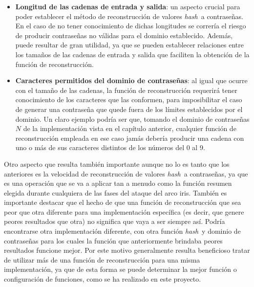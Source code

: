 \documentclass[12pt,spanish,listoffigures,listoftables]{tfgetsinf}
\newcommand{\hash}{\textit{hash}}
\begin{document}
\begin{itemize}

    \item \textbf{Longitud de las cadenas de entrada y salida}: un aspecto crucial para poder establecer el método de reconstrucción de valores \hash~a contraseñas. En el caso de no tener conocimiento de dichas longitudes se correría el riesgo de producir contraseñas no válidas para el dominio establecido. Además, puede resultar de gran utilidad, ya que se pueden establecer relaciones entre los tamaños de las cadenas de entrada y salida que faciliten la obtención de la función de reconstrucción. 
    
    \item \textbf{Caracteres permitidos del dominio de contraseñas}: al igual que ocurre con el tamaño de las cadenas, la función de reconstrucción requerirá tener conocimiento de los caracteres que las conformen, para imposibilitar el caso de generar una contraseña que quede fuera de los límites establecidos por el dominio. Un claro ejemplo podría ser que, tomando el dominio de contraseñas $N$ de la implementación vista en el capítulo anterior, cualquier función de reconstrucción empleada en ese caso jamás debería producir una cadena con uno o más de sus caracteres distintos de los números del 0 al 9.
    
\end{itemize}

Otro aspecto que resulta también importante aunque no lo es tanto que los anteriores es la velocidad de reconstrucción de valores \hash~a contraseñas, ya que es una operación que se va a aplicar tan a menudo como la función resumen elegida durante cualquiera de las fases del ataque del arco iris. También es importante destacar que el hecho de que una función de reconstrucción que sea peor que otra diferente para una implementación específica (es decir, que genere peores resultados que otra) no significa que vaya a ser siempre así. Podría encontrarse otra implementación diferente, con otra función \hash~y dominio de contraseñas para los cuales la función que anteriormente brindaba peores resultados funcione mejor. Por este motivo generalmente resulta beneficioso tratar de utilizar más de una función de reconstrucción para una misma implementación, ya que de esta forma se puede determinar la mejor función o configuración de funciones, como se ha realizado en este proyecto.
\end{document}
